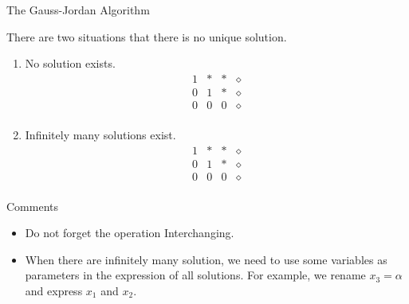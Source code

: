 \documentclass[hyperref={pdfpagelabels=true}]{beamer}
\newcommand{\<}{\langle}
\renewcommand{\>}{\rangle}
\begin{document}
\begin{frame}{The Gauss-Jordan Algorithm}
    \begin{spacing}{0.5}
    \begin{block}{}
        There are two situations that there is no unique solution.
        \begin{enumerate}
            
            \item No solution exists.
            \[
                \begin{array}{ccc|c}
                1 & * & * & \diamond \\
                0 & 1 & * & \diamond \\
                0 & 0 & 0 & \diamond \\
                \end{array}
            \]
            \item Infinitely many solutions exist.
            \[
                \begin{array}{ccc|c}
                1 & * & * & \diamond \\
                0 & 1 & * & \diamond \\
                0 & 0 & 0 & \diamond \\
                \end{array}
            \]
            
        \end{enumerate}
    \end{block}
    \end{spacing}
    \begin{block}{Comments}
        \begin{itemize}
            \item Do not forget the operation Interchanging.
            \item When there are infinitely many solution, we need to use some variables as parameters in the expression of all solutions. For example, we rename $x_3 = \alpha$ and express $x_1$ and $x_2$.
        \end{itemize}
    \end{block}
             
\end{frame}
\end{document}

